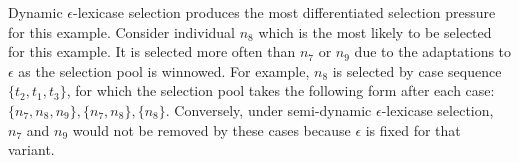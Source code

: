 \documentclass[twoside]{article}
\begin{document}
Dynamic $\epsilon$-lexicase selection produces the most differentiated selection pressure for this example. Consider individual $n_8$ which is the most likely to be selected for this example. It is selected more often than $n_7$ or $n_9$ due to the adaptations to $\epsilon$ as the selection pool is winnowed. For example, $n_8$ is selected by case sequence $\{t_2,t_1,t_3\}$, for which the selection pool takes the following form after each case: $\{n_7, n_8, n_9\}, \{n_7, n_8\}, \{n_8\}$. Conversely, under semi-dynamic $\epsilon$-lexicase selection, $n_7$ and $n_9$ would not be removed by these cases because $\epsilon$ is fixed for that variant. 


\end{document}

